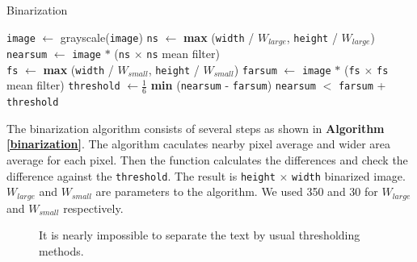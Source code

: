 \documentclass[10pt,twocolumn,letterpaper]{article}
\begin{document}
\begin{algorithm}
\caption{Binarization} \label{binarization}
\begin{algorithmic}[1]
\State \texttt{image} $\gets$ grayscale(\texttt{image})
\State \texttt{ns} $\gets$ \textbf{max} (\texttt{width} / $W_{large}$, \texttt{height} / $W_{large}$)
\State \texttt{nearsum} $\gets$ \texttt{image} $\ast$ (\texttt{ns} $\times$ \texttt{ns} mean filter) \\
\State \texttt{fs} $\gets$ \textbf{max} (\texttt{width} / $W_{small}$, \texttt{height} / $W_{small}$)
\State \texttt{farsum} $\gets$ \texttt{image} $\ast$ (\texttt{fs} $\times$ \texttt{fs} mean filter)
\State \texttt{threshold} $\gets \frac{1}{6}$ \textbf{min} (\texttt{nearsum} - \texttt{farsum})
\State \Return \texttt{nearsum} $<$ \texttt{farsum} + \texttt{threshold}
\EndFunction
\end{algorithmic}
\end{algorithm}

The binarization algorithm consists of several steps as shown in \textbf{Algorithm \ref{binarization}}.
The algorithm caculates nearby pixel average and wider area average for each pixel.
Then the function calculates the differences and check the difference against the \texttt{threshold}.
The result is \texttt{height} $\times$ \texttt{width} binarized image.
$W_{large}$ and $W_{small}$ are parameters to the algorithm.
We used 350 and 30 for $W_{large}$ and $W_{small}$ respectively.

\begin{figure}[t]
\begin{center}
\end{center}
   \caption{It is nearly impossible to separate the text by usual thresholding methods. }
\label{fig:thresholding}
\end{figure}
\end{document}
